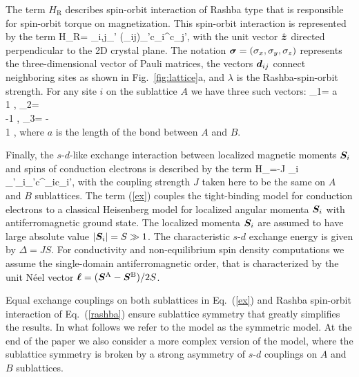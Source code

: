 The term $H_\textrm{R}$ describes spin-orbit interaction of Rashba type that is responsible for spin-orbit torque on magnetization. This spin-orbit interaction is represented by the term
\be
\label{rashba}
H_\textrm{R}= \s_{\la i,j\ra}\s_{\sigma\sigma'}
\cdot(\bm{\sigma}_{ij})_{\sigma\sigma'}c_{i\sigma}^\dagger c\0_{j\sigma'},
\e
with the unit vector $\hat{\boldsymbol{z}}$ directed perpendicular to the 2D crystal plane. The notation $\boldsymbol{\sigma}=(\sigma_x,\sigma_y,\sigma_z)$ represents the three-dimensional vector of Pauli matrices, the vectors $\boldsymbol{d}_{ij}$ connect neighboring sites as shown in Fig.~\ref{fig:lattice}a, and $\lambda$ is the Rashba-spin-orbit strength. For any site $i$ on the sublattice $A$ we have three such vectors:
\be
{}_{1}= a  \\ 1 \epm, \quad {}_{2}=  \bpm {} \\ -1 \epm , \quad {}_{3}= - \bpm {}  \\ 1 \epm,
\e
where $a$ is the length of the bond between $A$ and $B$.

Finally, the $s$-$d$-like exchange interaction between localized magnetic moments $\boldsymbol{S}_i$ and spins of conduction electrons is described by the term
\be
\label{ex}
H_=-J \s_{i} \s_{\sigma\sigma'}_i\cdot \bb{\sigma}_{\sigma\sigma'}c^\dagger_{i\sigma}c\0_{i\sigma'},
\e
with the coupling strength $J$ taken here to be the same on $A$ and $B$ sublattices. The term (\ref{ex}) couples the tight-binding model for conduction electrons to a  classical Heisenberg model for localized angular momenta $\boldsymbol{S}_i$ with antiferromagnetic ground state. The localized momenta $\boldsymbol{S}_i$ are assumed to have large absolute value $|\boldsymbol{S}_i|=S\gg 1$. The characteristic $s$-$d$ exchange energy is given by $\Delta = J S$.  For conductivity and non-equilibrium spin density computations we assume the single-domain antiferromagnetic order, that is characterized by the unit N\'eel vector $\boldsymbol{\ell} = (\boldsymbol{S}^\textrm{A}-\boldsymbol{S}^\textrm{B})/2S$. 

Equal exchange couplings on both sublattices in Eq.~(\ref{ex}) and Rashba spin-orbit interaction of Eq.~(\ref{rashba}) ensure sublattice symmetry that greatly simplifies the results. In what follows we refer to the model as the symmetric model. At the end of the paper we also consider a more complex version of the model, where the sublattice symmetry is broken by a strong asymmetry of $s$-$d$ couplings on $A$ and $B$ sublattices.
 
